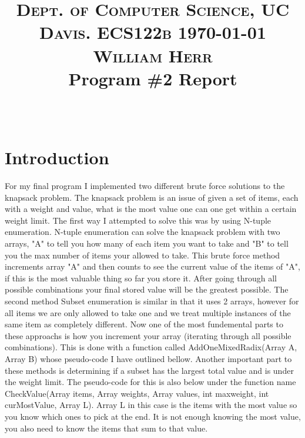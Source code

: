 \documentclass[paper=a4, fontsize=11pt]{scrartcl} %
\title{ 
\normalfont \normalsize 
\textsc{Dept. of Computer Science, UC Davis. ECS122b \today\\ William Herr \hfill } %
\horrule{0.5pt} \\[0.4cm] %
\huge Program \#2 Report \\ %
\horrule{2pt} \\[0.5cm] %
}
\author{} %
\date{}
\numberwithin{equation}{section} %
\numberwithin{figure}{section} %
\numberwithin{table}{section} %
\begin{document}
\maketitle %
\vspace{-1.3in}


\section{Introduction}
For my final program I implemented two different brute force solutions to the knapsack problem. The knapsack problem is an issue of given a set of items, each with a weight and value, what is the most value one can one get within a certain weight limit. The first way I attempted to solve this was by using N-tuple enumeration. N-tuple enumeration can solve the knapsack problem with two arrays, "A" to tell you how many of each item you want to take and "B" to tell you the max number of items your allowed to take. This brute force method increments array "A" and then counts to see the current value of the items of "A", if this is the most valuable thing so far you store it. After going through all possible combinations your final stored value will be the greatest possible. The second method Subset enumeration is similar in that it uses 2 arrays, however for all items we are only allowed to take one and we treat multiple instances of the same item as completely different. Now one of the most fundemental parts to these approachs is how you increment your array (iterating through all possible combinations). This is done with a function called AddOneMixedRadix(Array A, Array B) whose pseudo-code I have outlined bellow. Another important part to these methods is determining if a subset has the largest total value and is under the weight limit. The pseudo-code for this is also below under the function name CheckValue(Array items, Array weights, Array values, int maxweight, int curMostValue, Array L). Array L in this case is the items with the most value so you know which ones to pick at the end. It is not enough knowing the most value, you also need to know the items that sum to that value.
\end{document}
